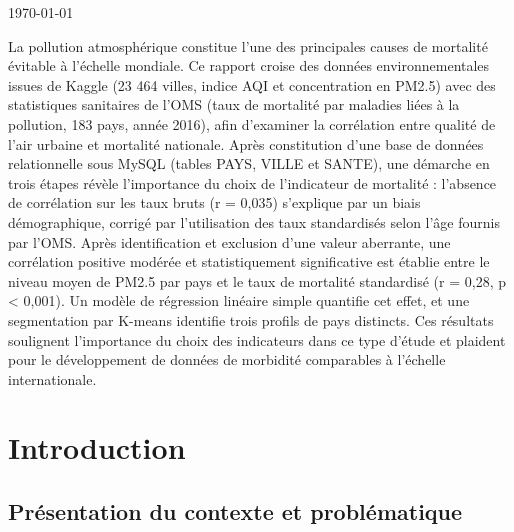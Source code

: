 \documentclass[mstat,12pt]{unswthesis}
\begin{document}
{\bigskip\bigskip\bigskip\noindent} \today




La pollution atmosphérique constitue l'une des principales causes de
mortalité évitable à l'échelle mondiale. Ce rapport croise des données
environnementales issues de Kaggle (23 464 villes, indice AQI et
concentration en PM2.5) avec des statistiques sanitaires de l'OMS (taux
de mortalité par maladies liées à la pollution, 183 pays, année 2016),
afin d'examiner la corrélation entre qualité de l'air urbaine et
mortalité nationale. Après constitution d'une base de données
relationnelle sous MySQL (tables PAYS, VILLE et SANTE), une démarche en
trois étapes révèle l'importance du choix de l'indicateur de mortalité :
l'absence de corrélation sur les taux bruts (r = 0,035) s'explique par
un biais démographique, corrigé par l'utilisation des taux standardisés
selon l'âge fournis par l'OMS. Après identification et exclusion d'une
valeur aberrante, une corrélation positive modérée et statistiquement
significative est établie entre le niveau moyen de PM2.5 par pays et le
taux de mortalité standardisé (r = 0,28, p \textless{} 0,001). Un modèle
de régression linéaire simple quantifie cet effet, et une segmentation
par K-means identifie trois profils de pays distincts. Ces résultats
soulignent l'importance du choix des indicateurs dans ce type d'étude et
plaident pour le développement de données de morbidité comparables à
l'échelle internationale.



\afterpreface





%
%






\chapter{Introduction}\label{introduction}

\section{Présentation du contexte et
problématique}\label{pruxe9sentation-du-contexte-et-probluxe9matique}
\end{document}
